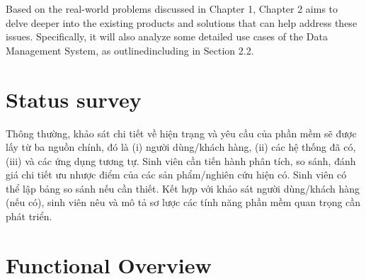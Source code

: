 \documentclass[../Main.tex]{subfiles}
\begin{document}
Based on the real-world problems discussed in Chapter 1, Chapter 2 aims to delve deeper into the existing products and solutions that can help address these issues. Specifically, it will also analyze some detailed use cases of the Data Management System, as outlinedincluding in Section 2.2.
\section{Status survey}
\label{section:2.1}
Thông thường, khảo sát chi tiết về hiện trạng và yêu cầu của phần mềm sẽ được lấy từ ba nguồn chính, đó là (i) người dùng/khách hàng, (ii) các hệ thống đã có, (iii) và các ứng dụng tương tự.
Sinh viên cần tiến hành phân tích, so sánh, đánh giá chi tiết ưu nhược điểm của các sản phẩm/nghiên cứu hiện có. Sinh viên có thể lập bảng so sánh nếu cần thiết. Kết hợp với khảo sát người dùng/khách hàng (nếu có), sinh viên nêu và mô tả sơ lược các tính năng phần mềm quan trọng cần phát triển.

\section{Functional Overview}
\label{section:2.2}
\end{document}
